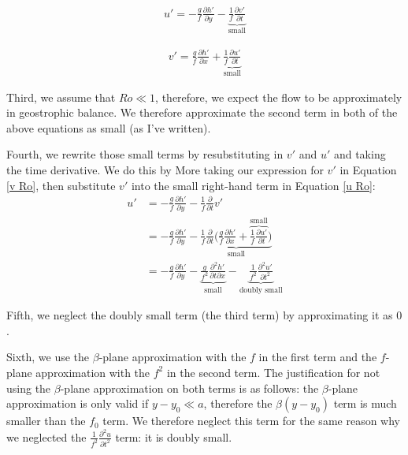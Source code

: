 \begin{minipage}{.48\linewidth}
    \begin{align}
        \label{u Ro}
        u'=-\frac{g}{f}\frac{\partial h'}{\partial y}-\underbrace{\frac{1}{f}\frac{\partial v'}{\partial t}}_{\text{small}}
    \end{align}
\end{minipage}
\hfill
\begin{minipage}{.48\linewidth}
    \begin{align}
        \label{v Ro}
        v'=\frac{g}{f}\frac{\partial h'}{\partial x}+\underbrace{\frac{1}{f}\frac{\partial u'}{\partial t}}_\text{small}
    \end{align}
\end{minipage}

Third, we assume that $Ro\ll 1$, therefore, we expect the flow to be approximately in geostrophic balance. We therefore approximate the second term in both of the above equations as small (as I've written).

Fourth, we rewrite those small terms by resubstituting in $v'$ and $u'$ and taking the time derivative. We do this by More taking our expression for $v'$ in Equation \ref{v Ro}, then substitute $v'$ into the small right-hand term in Equation \ref{u Ro}:
\begin{align*}
    u'&=-\frac{g}{f}\frac{\partial h'}{\partial y}-\frac{1}{f}\frac{\partial }{\partial t}v'\\
    &=-\frac{g}{f}\frac{\partial h'}{\partial y}-
    \underbrace{\frac{1}{f}\frac{\partial }{\partial t} \biggl( \frac{g}{f}\frac{\partial h'}{\partial x}+\overbrace{\frac{1}{f}\frac{\partial u'}{\partial t}}^\text{small} \biggr)}_\text{small}
    \\
    &=-\frac{g}{f}\frac{\partial h'}{\partial y}
    -\underbrace{\frac{g}{f^2}\frac{\partial^2 h' }{\partial t \partial x}}_\text{small}
    -\underbrace{\frac{1}{f^2}\frac{\partial^2 u'}{\partial t^2}}_\text{doubly small}
\end{align*}

Fifth, we neglect the doubly small term (the third term) by approximating it as $0$.

Sixth, we use the $\beta$-plane approximation with the $f$ in the first term and the $f$-plane approximation with the $f^2$ in the second term. The justification for not using the $\beta$-plane approximation on both terms is as follows: the $\beta$-plane approximation is only valid if $y-y_0\ll a$, therefore the $\beta (y-y_0)$ term is much smaller than the $f_0$ term. We therefore neglect this term for the same reason why we neglected the $\frac{1}{f^2}\frac{\partial^2 u}{\partial t^2}$ term: it is doubly small. 

